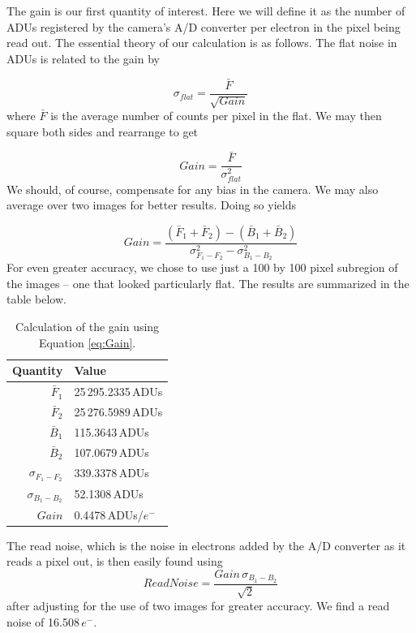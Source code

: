 \documentclass[12pt,letterpaper]{report}
\begin{document}
The gain is our first quantity of interest. Here we will define it as the number of ADUs registered by the camera's A/D converter per electron in the pixel being read out. The essential theory of our calculation is as follows. The flat noise in ADUs is related to the gain by

\begin{equation}
\sigma_{flat} = \frac{\bar{F}}{\sqrt{Gain}}
\label{eq:FlatNoise}
\end{equation}
where $\bar{F}$ is the average number of counts per pixel in the flat. We may then square both sides and rearrange to get

\begin{equation}
Gain = \frac{\bar{F}}{\sigma_{flat}^2}
\label{eq:SimpleGain}
\end{equation}
We should, of course, compensate for any bias in the camera. We may also average over two images for better results. Doing so yields

\begin{equation}
Gain = \frac{(\bar{F}_1 + \bar{F}_2) - (\bar{B}_1 + \bar{B}_2)}{\sigma_{F_1-F_2}^2 - \sigma_{B_1-B_2}^2}
\label{eq:Gain}
\end{equation}
For even greater accuracy, we chose to use just a 100 by 100 pixel subregion of the images -- one that looked particularly flat. The results are summarized in the table below.

\begin{table}[H]
	\centering
	\begin{tabular}{rl}
		Quantity & Value \\ \hline
		$\bar{F}_1$ & 25$\,$295.2335$\,$ADUs \rule{0pt}{14pt} \\
		$\bar{F}_2$ & 25$\,$276.5989$\,$ADUs \rule{0pt}{14pt} \\
		$\bar{B}_1$ & 115.3643$\,$ADUs \rule{0pt}{14pt} \\
		$\bar{B}_2$ & 107.0679$\,$ADUs \rule{0pt}{14pt} \\
		$\sigma_{F_1-F_2}$ & 339.3378$\,$ADUs \rule{0pt}{14pt} \\
		$\sigma_{B_1-B_2}$ & 52.1308$\,$ADUs \rule{0pt}{14pt} \\
		$Gain$ & 0.4478$\,$ADUs/$e^-$ \rule{0pt}{14pt}
	\end{tabular}
	\caption{Calculation of the gain using Equation \ref{eq:Gain}.}
	\label{tab:Gain}
\end{table}

The read noise, which is the noise in electrons added by the A/D converter as it reads a pixel out, is then easily found using
\begin{equation}
Read Noise = \frac{Gain\,\sigma_{B_1-B_2}}{\sqrt{2}}
\label{eq:ReadNoise}
\end{equation}
after adjusting for the use of two images for greater accuracy. We find a read noise of 16.508$\,e^-$.
\end{document}
